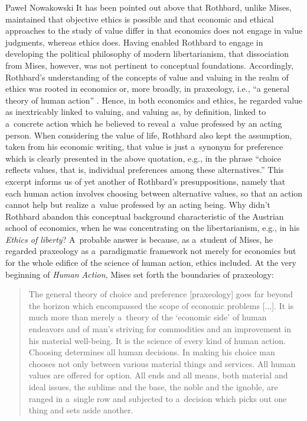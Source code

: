 \begin{artengenv}{Paweł Nowakowski}
It has been pointed out above that Rothbard, unlike Mises, maintained that objective ethics is possible and that economic and ethical approaches to the study of value differ in that economics does not engage in value judgments, whereas ethics does. Having enabled Rothbard to engage in developing the political philosophy of modern libertarianism, that dissociation from Mises, however, was not pertinent to conceptual foundations. Accordingly, Rothbard's understanding of the concepts of value and valuing in the realm of ethics was rooted in economics or, more broadly, in praxeology, i.e., ``a general theory of human action'' 
\parencite[][p.7]{Mises2008Human}. %
 Hence, in both economics and ethics, he regarded value as inextricably linked to valuing, and valuing as, by definition, linked to a~concrete action which he believed to reveal a~value professed by an acting person. When considering the value of life, Rothbard also kept the assumption, taken from his economic writing, that value is just a~synonym for preference which is clearly presented in the above quotation, e.g., in the phrase ``choice reflects values, that is, individual preferences among these alternatives.'' This excerpt informs us of yet another of Rothbard's presuppositions, namely that each human action involves choosing between alternative values, so that an action cannot help but realize a~value professed by an acting being. Why didn't Rothbard abandon this conceptual background characteristic of the Austrian school of economics, when he was concentrating on the libertarianism, e.g., in his \textit{Ethics of liberty}? A~probable answer is because, as a~student of Mises, he regarded praxeology as a~paradigmatic framework not merely for economics but for the whole edifice of the science of human action, ethics included. At the very beginning of \textit{Human Action}, Mises 
\parencite*[][p.3]{Mises2008Human} %
 set forth the boundaries of praxeology:

\begin{quote}
The general theory of choice and preference [praxeology] goes far beyond the horizon which encompassed the scope of economic problems [...]. It is much more than merely a~theory of the ‘economic side' of human endeavors and of man's striving for commodities and an improvement in his material well-being. It is the science of every kind of human action. Choosing determines all human decisions. In making his choice man chooses not only between various material things and services. All human values are offered for option. All ends and all means, both material and ideal issues, the sublime and the base, the noble and the ignoble, are ranged in a~single row and subjected to a~decision which picks out one thing and sets aside another.
\end{quote}




\end{artengenv}
